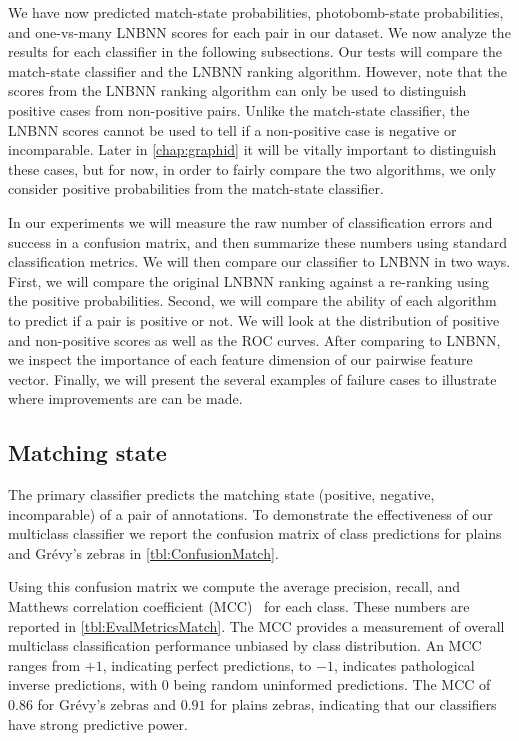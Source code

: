     We have now predicted match-state probabilities, photobomb-state probabilities, and one-vs-many LNBNN scores
      for each pair in our dataset.
    We now analyze the results for each classifier in the following subsections.
    Our tests will compare the match-state classifier and the LNBNN ranking algorithm.
    However, note that the scores from the LNBNN ranking algorithm can only be used to distinguish positive cases
      from non-positive pairs.
    Unlike the match-state classifier, the LNBNN scores cannot be used to tell if a non-positive case is negative
      or incomparable.
    Later in \cref{chap:graphid} it will be vitally important to distinguish these cases, but for now, in order
      to fairly compare the two algorithms, we only consider positive probabilities from the match-state
      classifier.

    In our experiments we will measure the raw number of classification errors and success in a confusion matrix,
      and then summarize these numbers using standard classification metrics.
    We will then compare our classifier to LNBNN in two ways.
    First, we will compare the original LNBNN ranking against a re-ranking using the positive probabilities.
    Second, we will compare the ability of each algorithm to predict if a pair is positive or not.
    We will look at the distribution of positive and non-positive scores as well as the ROC curves.
    After comparing to LNBNN, we inspect the importance of each feature dimension of our pairwise feature vector.
    Finally, we will present the several examples of failure cases to illustrate where improvements are can be
      made.

    \FloatBarrier{}
    \subsection{Matching state}

        The primary classifier predicts the matching state (positive, negative, incomparable) of a pair of
        annotations. To demonstrate the effectiveness of our multiclass classifier we report the confusion matrix
        of class predictions for plains and Grévy's zebras in \cref{tbl:ConfusionMatch}.

        Using this confusion matrix we compute the average precision, recall, and Matthews correlation
          coefficient (MCC)~\cite{powers_evaluation_2011} for each class.
        These numbers are reported in \cref{tbl:EvalMetricsMatch}.
        The MCC provides a measurement of overall multiclass classification performance unbiased by class
          distribution.
        An MCC ranges from $+1$, indicating perfect predictions, to $-1$, indicates pathological inverse
          predictions, with $0$ being random uninformed predictions.
        The MCC of $0.86$ for Grévy's zebras and $0.91$ for plains zebras, indicating that our classifiers have
          strong predictive power.

